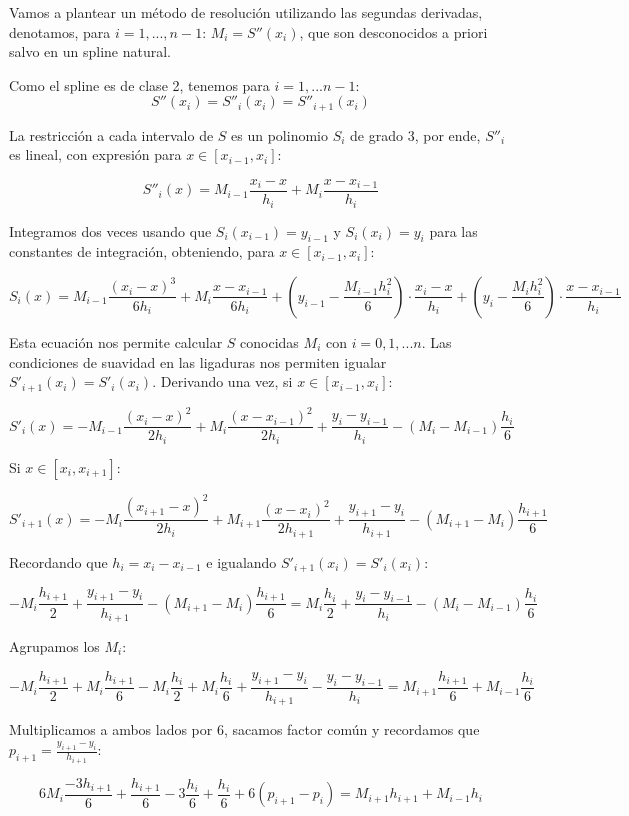 \documentclass[11pt,spanish,]{article}
\theoremstyle{definition} \newtheorem*{definicion}{Definición}
\begin{document}
Vamos a plantear un método de resolución utilizando las segundas
derivadas, denotamos, para $i=1, ..., n-1$: $M_i = S''(x_i)$, que son
desconocidos a priori salvo en un spline natural.

Como el spline es de clase 2, tenemos para $i=1, ... {n-1}$:
\[S''(x_i) = S''_i(x_i) = S''_{i+1}(x_i)\]

La restricción a cada intervalo de $S$ es un polinomio $S_i$ de grado 3,
por ende, $S''_i$ es lineal, con expresión para $x \in [x_{i-1},x_i]$:

\[S''_i(x) = M_{i-1} \frac{x_i-x}{h_i} + M_i\frac{x-x_{i-1}}{h_i}\]

Integramos dos veces usando que $S_i(x_{i-1}) = y_{i-1}$ y
$S_i(x_i) = y_i$ para las constantes de integración, obteniendo, para
${x \in [x_{i-1},x_i]}$:

\[S_i(x) = M_{i-1}\frac{(x_i-x)^3}{6h_i} + M_i\frac{x-x_{i-1}}{6h_i} + (y_{i-1}-\frac{ M_{i-1}h^2_i}{6}) \cdot \frac{x_i-x}{h_i} + (y_i-\frac{ M_ih^2_i}{6}) \cdot \frac{x-x_{i-1}}{h_i}\]

Esta ecuación nos permite calcular $S$ conocidas $M_i$ con $i=0,1,...n$.
Las condiciones de suavidad en las ligaduras nos permiten igualar
$S'_{i+1}(x_i) = S'_i(x_i)$. Derivando una vez, si
$x \in {[x_{i-1},x_i]}$:

\[S'_i(x) = -M_{i-1}\frac{(x_i-x)^2}{2h_i} + M_i\frac{(x-x_{i-1})^2}{2h_i} + \frac{y_i-y_{i-1}}{h_i} -(M_i-M_{i-1})\frac{h_i}{6}\]

Si $x \in {[x_{i},x_{i+1}]}$:

\[S'_{i+1}(x) = -M_i\frac{(x_{i+1}-x)^2}{2h_i} + M_{i+1}\frac{(x-x_i)^2}{2h_{i+1}}
 + \frac{y_{i+1}-y_i}{h_{i+1}} -(M_{i+1}-M_i)\frac{h_{i+1}}{6}\]

Recordando que $h_i = x_i - x_{i-1}$ e igualando
$S'_{i+1}(x_i) = S'_i(x_i)$:

\[-M_i\frac{h_{i+1}}{2} + \frac{y_{i+1}-y_i}{h_{i+1}} -(M_{i+1}-M_i)\frac{h_{i+1}}{6}
=  M_i\frac{h_i}{2} + \frac{y_i-y_{i-1}}{h_i} -(M_i-M_{i-1})\frac{h_i}{6}\]

Agrupamos los $M_i$:

\[-M_i\frac{h_{i+1}}{2} + M_i\frac{h_{i+1}}{6} - M_i\frac{h_i}{2} + M_i\frac{h_i}{6} + \frac{y_{i+1}-y_i}{h_{i+1}} - \frac{y_i-y_{i-1}}{h_i} =  M_{i+1}\frac{h_{i+1}}{6} + M_{i-1}\frac{h_i}{6}\]

Multiplicamos a ambos lados por $6$, sacamos factor común y recordamos
que $p_{i+1} = \frac{y_{i+1}-y_i}{h_{i+1}}$:

\[6M_i\frac{-3h_{i+1}}{6} + \frac{h_{i+1}}{6} - 3\frac{h_i}{6} + \frac{h_i}{6} + 6(p_{i+1} - p_i) =  M_{i+1}h_{i+1} + M_{i-1}h_i\]
\end{document}
